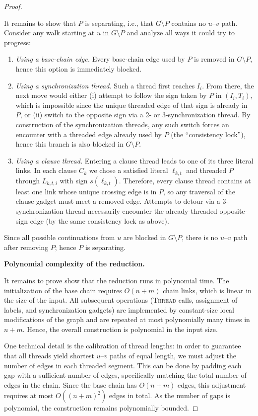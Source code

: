 \documentclass[journal ]{new-aiaa}
\numberwithin{equation}{section}
\theoremstyle{definition}
\theoremstyle{plain}
\theoremstyle{remark}
\begin{document}
\begin{proof}
\begin{enumerate}[label=(\alph*)]
It remains to show that $P$ is separating, i.e., that $G\setminus P$ contains no $u$--$v$ path. Consider any walk starting at $u$ in $G\setminus P$ and analyze all ways it could try to progress:
\begin{enumerate}
  \item \emph{Using a base-chain edge.} Every base-chain edge used by $P$ is removed in $G\setminus P$, hence this option is immediately blocked.
  \item \emph{Using a synchronization thread.} Such a thread first reaches $I_i$. From there, the next move would either (i) attempt to follow the sign taken by $P$ in $(I_i,T_i)$, which is impossible since the unique threaded edge of that sign is already in $P$, or (ii) switch to the opposite sign via a 2- or 3-synchronization thread. By construction of the synchronization threads, any such switch forces an encounter with a threaded edge already used by $P$ (the “consistency lock”), hence this branch is also blocked in $G\setminus P$.
  \item \emph{Using a clause thread.} Entering a clause thread leads to one of its three literal links. In each clause $C_k$ we chose a satisfied literal $\ell_{k,t}$ and threaded $P$ through $L_{k,t,i}$ with sign $s(\ell_{k,t})$. Therefore, every clause thread contains at least one link whose unique crossing edge is in $P$, so any traversal of the clause gadget must meet a removed edge. Attempts to detour via a 3-synchronization thread necessarily encounter the already-threaded opposite-sign edge (by the same consistency lock as above).
\end{enumerate}
Since all possible continuations from $u$ are blocked in $G\setminus P$, there is no $u$--$v$ path after removing $P$; hence $P$ is separating.
\end{enumerate}

\textbf{Polynomial complexity of the reduction.}

It remains to prove show that the reduction runs in polynomial time.  
The initialization of the base chain requires $O(n+m)$ chain links, which is linear in the size of the input.  
All subsequent operations (\textsc{Thread} calls, assignment of labels, and synchronization gadgets) are implemented by constant-size local modifications of the graph and are repeated at most polynomially many times in $n+m$.  
Hence, the overall construction is polynomial in the input size.

\smallskip
\noindent
One technical detail is the calibration of thread lengths: in order to guarantee that all threads yield shortest $u$--$v$ paths of equal length, we must adjust the number of edges in each threaded segment.  
This can be done by padding each gap with a sufficient number of edges, specifically matching the total number of edges in the chain.  
Since the base chain has $O(n+m)$ edges, this adjustment requires at most $O((n+m)^2)$ edges in total.  
As the number of gaps is polynomial, the construction remains polynomially bounded.


\end{proof}
\end{document}
